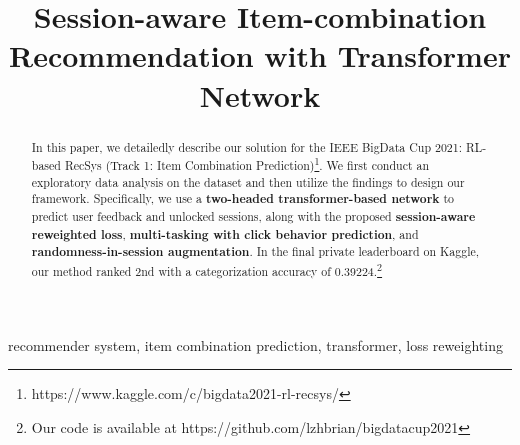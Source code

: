 \documentclass[conference]{IEEEtran}
\newcommand{\chen}[1]{\footnote{+chen+: #1}}
\begin{document}
\title{Session-aware Item-combination Recommendation with Transformer Network}

\author{
\and
{}
}



\maketitle

\begin{abstract}
    In this paper, we detailedly describe our solution for the IEEE BigData Cup 2021: RL-based RecSys (Track 1: Item Combination Prediction)\footnote{https://www.kaggle.com/c/bigdata2021-rl-recsys/}.
    We first conduct an exploratory data analysis on the dataset and then utilize the findings to design our framework.
    Specifically, we use a \textbf{two-headed transformer-based network} to predict user feedback and unlocked sessions, along with the proposed \textbf{session-aware reweighted loss}, \textbf{multi-tasking with click behavior prediction}, and \textbf{randomness-in-session augmentation}.
    In the final private leaderboard on Kaggle, our method ranked 2nd with a categorization accuracy of 0.39224.\footnote{Our code is available at https://github.com/lzhbrian/bigdatacup2021}
\end{abstract}

\begin{IEEEkeywords}
recommender system, item combination prediction, transformer, loss reweighting
\end{IEEEkeywords}








% 




\balance


\end{document}
